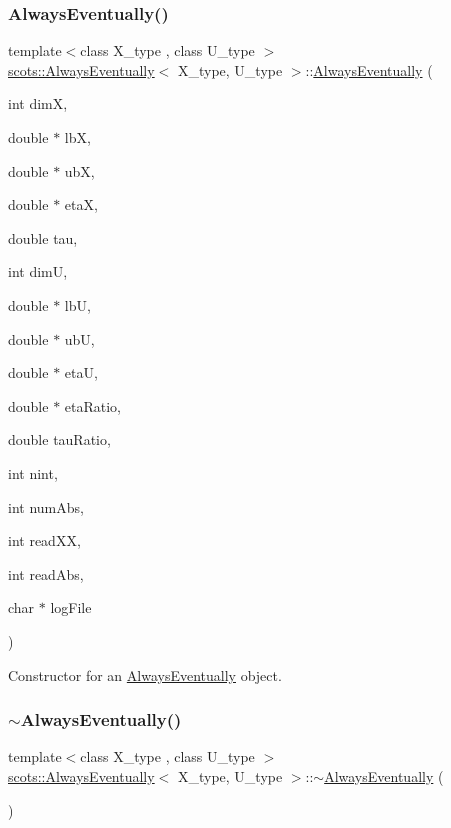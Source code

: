 \subsubsection{\texorpdfstring{Always\+Eventually()}{AlwaysEventually()}}
{\footnotesize\ttfamily template$<$class X\+\_\+type , class U\+\_\+type $>$ \\
\hyperlink{classscots_1_1AlwaysEventually}{scots\+::\+Always\+Eventually}$<$ X\+\_\+type, U\+\_\+type $>$\+::\hyperlink{classscots_1_1AlwaysEventually}{Always\+Eventually} (\begin{DoxyParamCaption}\item[{int}]{dimX,  }\item[{double $\ast$}]{lbX,  }\item[{double $\ast$}]{ubX,  }\item[{double $\ast$}]{etaX,  }\item[{double}]{tau,  }\item[{int}]{dimU,  }\item[{double $\ast$}]{lbU,  }\item[{double $\ast$}]{ubU,  }\item[{double $\ast$}]{etaU,  }\item[{double $\ast$}]{eta\+Ratio,  }\item[{double}]{tau\+Ratio,  }\item[{int}]{nint,  }\item[{int}]{num\+Abs,  }\item[{int}]{read\+XX,  }\item[{int}]{read\+Abs,  }\item[{char $\ast$}]{log\+File }\end{DoxyParamCaption})\hspace{0.3cm}{\ttfamily [inline]}}

Constructor for an \hyperlink{classscots_1_1AlwaysEventually}{Always\+Eventually} object. \mbox{\label{classscots_1_1AlwaysEventually_aa3d060f750bf82b5a41afdf7d925c3bb}} 
\subsubsection{\texorpdfstring{$\sim$\+Always\+Eventually()}{~AlwaysEventually()}}
{\footnotesize\ttfamily template$<$class X\+\_\+type , class U\+\_\+type $>$ \\
\hyperlink{classscots_1_1AlwaysEventually}{scots\+::\+Always\+Eventually}$<$ X\+\_\+type, U\+\_\+type $>$\+::$\sim$\hyperlink{classscots_1_1AlwaysEventually}{Always\+Eventually} (\begin{DoxyParamCaption}{ }\end{DoxyParamCaption})\hspace{0.3cm}{\ttfamily [inline]}}

